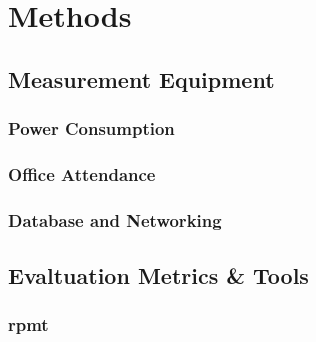 \chapter{Methods}\label{chap:methods}

\section{Measurement Equipment}\label{sec:measurement}

\subsection{Power Consumption}\label{subsec:powerMeasurement}

\subsection{Office Attendance}\label{subsec:attendance}

\subsection{Database and Networking}\label{subsec:databaseNetworking}

\section{Evaltuation Metrics \& Tools}\label{sec:metricsTools}

\subsection{}\label{subsec:KPI}

\subsection{\acrfull{rpmt}}\label{subsec:RPMT}
